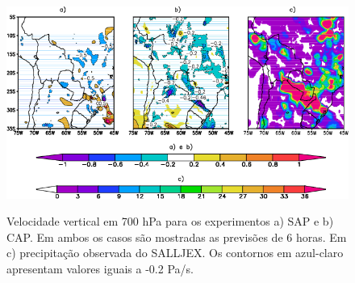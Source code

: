 \begin{figure}[!hbp]

\includegraphics[height=7cm]{./figs/omega.png}
\caption{Velocidade vertical em 700 hPa para os experimentos a) SAP e b) CAP. Em ambos os casos são mostradas as previsões de 6 horas. Em c) precipitação observada do SALLJEX. Os contornos em azul-claro apresentam valores iguais a -0.2 Pa/s.}
\label{fig20}
\end{figure}

